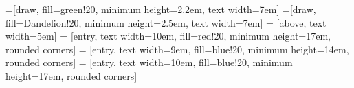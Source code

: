 
\usetikzlibrary{calc,arrows.meta,positioning,arrows}

=[draw, fill=green!20, minimum height=2.2em, text width=7em]
=[draw, fill=Dandelion!20, minimum height=2.5em, text width=7em]
 = [above, text width=5em]
 = [entry, text width=10em, fill=red!20, 
minimum height=17em, rounded corners]
 = [entry, text width=9em, fill=blue!20, 
minimum height=14em, rounded corners]
 = [entry, text width=10em, fill=blue!20, 
minimum height=17em, rounded corners]
\def\blockdist{2.3}
\def\edgedist{2.5}
